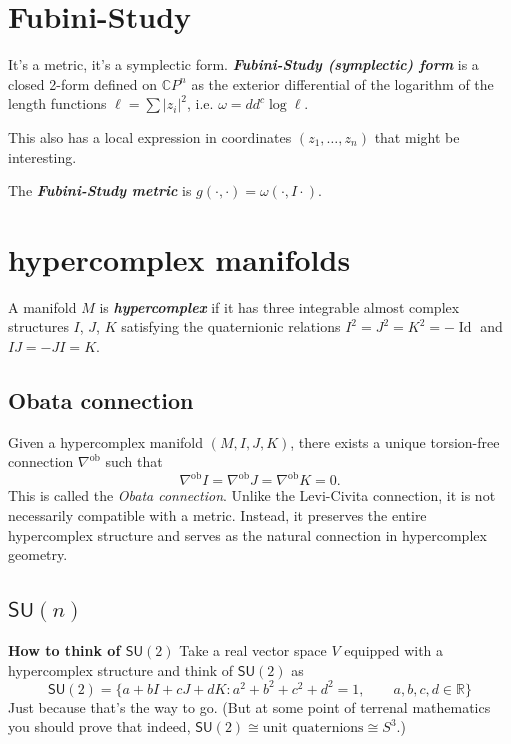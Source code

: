\section{Fubini-Study}
It's a metric, it's a symplectic form. \textit{\textbf{Fubini-Study (symplectic) form}} is a closed 2-form defined on \(\mathbb{C}P^{n}\) as the exterior differential of the logarithm of the length functions \(\ell=\sum |z_i|^2\), i.e. \(\omega=dd^c \operatorname{log} \ell\).

This also has a local expression in coordinates \((z_1,\ldots,z_n)\) that might be interesting.

The \textit{\textbf{Fubini-Study metric}} is \(g(\cdot ,\cdot )=\omega(\cdot ,I\cdot )\).

\section{hypercomplex manifolds}

\begin{defn}\leavevmode
	A manifold $M$ is \textit{\textbf{hypercomplex}} if it has three integrable almost complex structures  $I$,  $J$, $K$ satisfying the quaternionic relations $I^2=J^2=K^2=-\operatorname{Id}$ and $I J=-J I=K$.
\end{defn}

\subsection{Obata connection}

\begin{remark}
    Given a hypercomplex manifold $(M, I, J, K)$, there exists a unique torsion-free connection $\nabla^{\operatorname{ob}}$ such that
    \[
    \nabla^{\operatorname{ob}} I = \nabla^{\operatorname{ob}} J = \nabla^{\operatorname{ob}} K = 0.
    \]
    This is called the \textit{Obata connection}. Unlike the Levi-Civita connection, it is not necessarily compatible with a metric. Instead, it preserves the entire hypercomplex structure and serves as the natural connection in hypercomplex geometry.
\end{remark}

\subsection{\(\mathsf{SU}(n)\)}

\textbf{How to think of \(\mathsf{SU}(2)\)} Take a real vector space \(V\) equipped with a hypercomplex structure and think of \(\mathsf{SU}(2)\) as
\[\mathsf{SU}(2)=\{a+b I+c J+ d K: a^2+b^2+c^2+d^2=1,\qquad a,b,c,d \in \mathbb{R} \}\]
Just because that's the way to go. (But at some point of terrenal mathematics you should prove that indeed, \(\mathsf{SU}(2)\cong \text{unit quaternions} \cong S^3\).)

